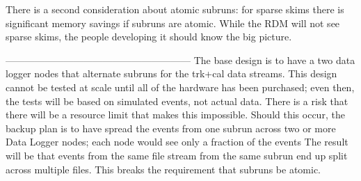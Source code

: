 There is a second consideration about atomic subruns:
for sparse skims there is significant memory savings if subruns are atomic.
While the RDM will not see sparse skims, the people developing it should know the big picture.


---------------------------------------------------------
The base design is to have a two data logger nodes that alternate subruns
for the trk+cal data streams.
This design cannot be tested at scale until all of the hardware has been purchased;
even then, the tests will be based on simulated events, not actual data.
There is a risk that there will be a resource limit that makes this impossible.
Should this occur, the backup plan is to have spread the events from one
subrun across two or more Data Logger nodes;
each node would see only a fraction of the events
The result will be that events from the same file stream
from the same subrun end up split across multiple files.
This breaks the requirement that subruns be atomic.

